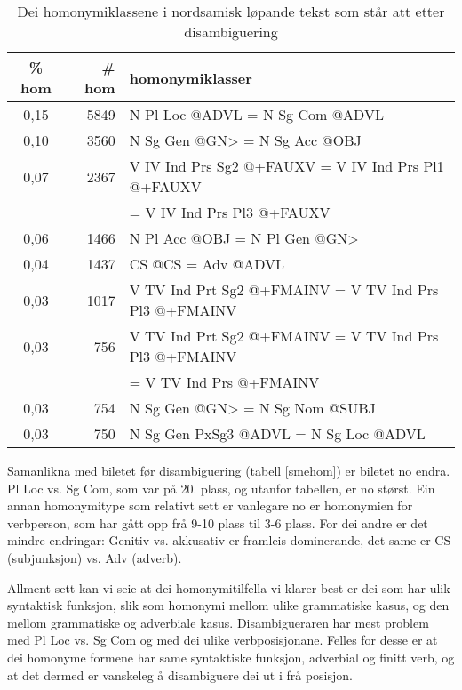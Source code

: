 \documentclass[a4paper,norsk]{article}
\begin{document}
\begin{table}[htdp]
\caption{Dei homonymiklassene i nordsamisk løpande tekst som står att etter disambiguering}
\begin{center}
\begin{tabular}{|c|r|l|}
\hline
\% hom & \# hom & homonymiklasser \\
\hline
0,15 & 5849 & N Pl Loc @ADVL = N Sg Com @ADVL \\ 
0,10 & 3560 & N Sg Gen @GN> = N Sg Acc @OBJ \\ 
0,07 & 2367 & V IV Ind Prs Sg2 @+FAUXV = V IV Ind Prs Pl1 @+FAUXV \\
     &      &  = V IV Ind Prs Pl3 @+FAUXV \\ 
0,06 & 1466 & N Pl Acc @OBJ = N Pl Gen @GN> \\ 
0,04 & 1437 & CS @CS = Adv @ADVL \\ 
0,03 & 1017 & V TV Ind Prt Sg2 @+FMAINV = V TV Ind Prs Pl3 @+FMAINV \\ 
0,03 & 756 & V TV Ind Prt Sg2 @+FMAINV = V TV Ind Prs Pl3 @+FMAINV \\
     &     &  = V TV Ind Prs @+FMAINV \\ 
0,03 & 754 & N Sg Gen @GN> = N Sg Nom @SUBJ \\ 
0,03 & 750 & N Sg Gen PxSg3 @ADVL = N Sg Loc @ADVL \\ 
\hline
\end{tabular}
\end{center}
\label{smedishom}
\end{table}%


Samanlikna med biletet før disambiguering (tabell \ref{smehom}) er biletet no endra. Pl Loc vs. Sg Com, som var på 20. plass, og utanfor tabellen, er no størst. Ein annan homonymitype som relativt sett er vanlegare no er homonymien for verbperson, som har gått opp frå 9-10 plass til 3-6 plass. For dei andre er det mindre endringar: Genitiv vs. akkusativ er framleis dominerande, det same er CS (subjunksjon) vs. Adv (adverb). %

Allment sett kan vi seie at dei homonymitilfella vi klarer best er dei som har ulik syntaktisk funksjon, slik som homonymi mellom ulike grammatiske kasus, og den mellom grammatiske og adverbiale kasus. Disambigueraren har mest problem med Pl Loc vs. Sg Com og med dei ulike verbposisjonane. Felles for desse er at dei homonyme formene har same syntaktiske funksjon, adverbial og finitt verb, og at det dermed er vanskeleg å disambiguere dei ut i frå posisjon. %
\end{document}
